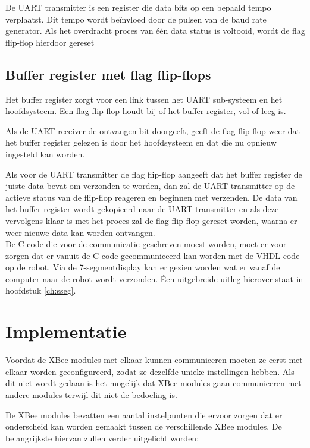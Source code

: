 \documentclass{report}
\begin{document}
 De UART transmitter is een register die data bits op een bepaald tempo verplaatst.
Dit tempo wordt beïnvloed door de pulsen van de baud rate generator.
Als het overdracht proces van één data status is voltooid, wordt de flag flip-flop hierdoor gereset
 
\subsection*{Buffer register met flag flip-flops}

 Het buffer register zorgt voor een link tussen het UART sub-systeem en het hoofdsysteem.
Een flag flip-flop houdt bij of het buffer register, vol of leeg is.

Als de UART receiver de ontvangen bit doorgeeft, geeft de flag flip-flop weer dat het buffer register gelezen is door het hoofdsysteem en dat die nu opnieuw ingesteld kan worden.

Als voor de UART transmitter de flag flip-flop aangeeft dat het buffer register de juiste data bevat om verzonden te worden, dan zal de UART transmitter op de actieve status van de flip-flop reageren en beginnen met verzenden.
De data van het buffer register wordt gekopieerd naar de UART transmitter en als deze vervolgens klaar is met het proces zal de flag flip-flop gereset worden, waarna er weer nieuwe data kan worden ontvangen.
\\

De C-code die voor de communicatie geschreven moest worden, moet er voor zorgen dat er vanuit de C-code gecommuniceerd kan worden met de VHDL-code op de robot.
Via de 7-segmentdisplay kan er gezien worden wat er vanaf de computer naar de robot wordt verzonden. Éen uitgebreide uitleg hierover staat in hoofdstuk \ref{ch:sseg}.


\section{Implementatie}
Voordat de XBee modules met elkaar kunnen communiceren moeten ze eerst met elkaar worden geconfigureerd, zodat ze dezelfde unieke instellingen hebben.
Als dit niet wordt gedaan is het mogelijk dat XBee modules gaan communiceren met andere modules terwijl dit niet de bedoeling is.

De XBee modules bevatten een aantal instelpunten die ervoor zorgen dat er onderscheid kan worden gemaakt tussen de verschillende XBee modules.
De belangrijkste hiervan zullen verder uitgelicht worden:
\end{document}
